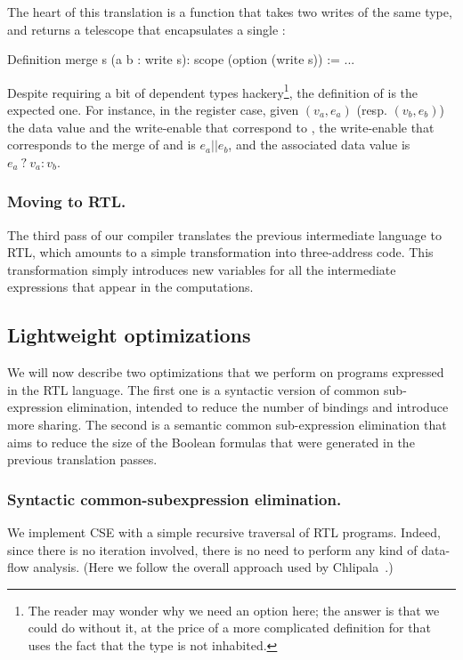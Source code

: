 \documentclass{llncs}
\begin{document}
The heart of this translation is a  function that takes
two writes of the same type, and returns a telescope that
encapsulates a single : 
\begin{mcoq}
Definition merge s (a b : write s): scope (option (write s)) := ...   
\end{mcoq}
Despite requiring a bit of dependent types hackery\footnote{The
  reader may wonder why we need an option here; the answer is that we
  could do without it, at the price of a more complicated definition
  for  that uses the fact that the type
%
  \mbox{} is not inhabited.}, the definition of
\mbox{} is the expected one.
%
For instance, in the register case, given $(v_a,e_a)$ (resp. $(v_b,
e_b)$) the data value and the write-enable that correspond to
, the write-enable that corresponds to the merge of 
and  is $e_a || e_b$, and the associated data value is
\mbox{$e_a~?~v_a : v_b$}.

\subsubsection{Moving to RTL.} The third pass of our compiler translates
the previous intermediate language to RTL, which amounts to a simple
transformation into three-address code. This transformation simply
introduces new variables for all the intermediate expressions that
appear in the computations. 

\subsection{Lightweight optimizations}
We will now describe two optimizations that we perform on programs
expressed in the RTL language. 
%
The first one is a syntactic version of common sub-expression
elimination, intended to reduce the number of bindings and introduce
more sharing. 
%
The second is a semantic common sub-expression elimination that aims
to reduce the size of the Boolean formulas that were generated in the
previous translation passes.

\subsubsection{Syntactic common-subexpression elimination.}
We implement CSE with a simple recursive traversal of RTL
programs. Indeed, since there is no iteration involved, there is no
need to perform any kind of data-flow analysis. (Here we follow the
overall approach used by Chlipala~\cite{DBLP:conf/popl/Chlipala10}.)
\end{document}
